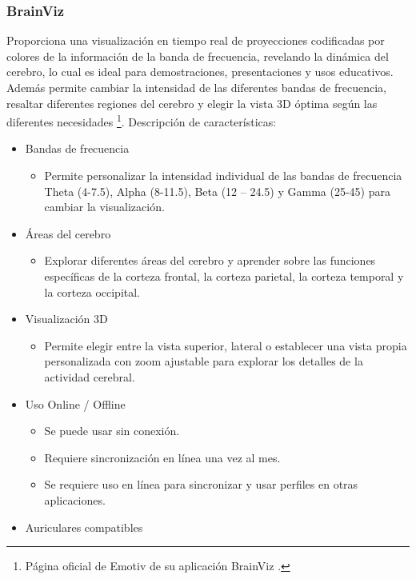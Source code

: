 \subsubsection{BrainViz}
Proporciona una visualización en tiempo real de proyecciones codificadas por colores de la información de la banda de frecuencia, revelando la dinámica del cerebro, lo cual es ideal para demostraciones, presentaciones y usos educativos. Además permite cambiar la intensidad de las diferentes bandas de frecuencia, resaltar diferentes regiones del cerebro y elegir la vista 3D óptima según las diferentes necesidades \cite{brainViz}\footnote{Página oficial de Emotiv de su aplicación BrainViz \cite{brainViz}.}. Descripción de características:
\begin{itemize}
    \item Bandas de frecuencia
    \begin{itemize}
        \item Permite personalizar la intensidad individual de las bandas de frecuencia Theta (4-7.5), Alpha (8-11.5), Beta (12 – 24.5) y Gamma (25-45) para cambiar la visualización.
    \end{itemize}
    \item Áreas del cerebro
    \begin{itemize}
        \item Explorar diferentes áreas del cerebro y aprender sobre las funciones específicas de la corteza frontal, la corteza parietal, la corteza temporal y la corteza occipital.
    \end{itemize}
    \item Visualización 3D
    \begin{itemize}
        \item Permite elegir entre la vista superior, lateral o establecer una vista propia personalizada con zoom ajustable para explorar los detalles de la actividad cerebral.
    \end{itemize}
    \item Uso Online / Offline
    \begin{itemize}
        \item Se puede usar sin conexión.
        \item Requiere sincronización en línea una vez al mes.
        \item Se requiere uso en línea para sincronizar y usar perfiles en otras aplicaciones.
    \end{itemize}
    \item Auriculares compatibles
    \begin{itemize}

\end{itemize}
\end{itemize}
